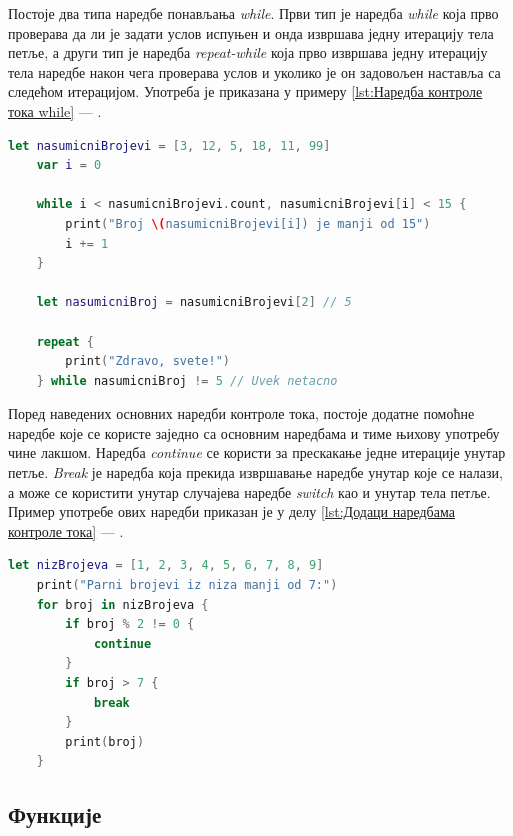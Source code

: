 \documentclass[12pt,oneside]{memoir}
\begin{document}
\indent Постоје два типа наредбе понављања \textit{while}. Први тип је наредба \textit{while} која прво проверава да ли је задати услов испуњен и онда извршава једну итерацију тела петље, а други тип је наредба \textit{repeat-while} која прво извршава једну итерацију тела наредбе након чега проверава услов и уколико је он задовољен наставља са следећом итерацијом. Употреба је приказана у примеру \ref{lst:Наредба контроле тока while} --- . 

\begin{lstlisting}[caption=\textit{{Наредба контроле тока while}}, label={lst:Наредба контроле тока while}, language=Swift, frame=single]
    let nasumicniBrojevi = [3, 12, 5, 18, 11, 99]
    var i = 0
    
    while i < nasumicniBrojevi.count, nasumicniBrojevi[i] < 15 {
        print("Broj \(nasumicniBrojevi[i]) je manji od 15")
        i += 1
    }
    
    let nasumicniBroj = nasumicniBrojevi[2] // 5
    
    repeat {
        print("Zdravo, svete!")
    } while nasumicniBroj != 5 // Uvek netacno
\end{lstlisting}

\indent Поред наведених основних наредби контроле тока, постоје додатне помоћне наредбе које се користе заједно са основним наредбама и тиме њихову употребу чине лакшом. Наредба \textit{continue} се користи за прескакање једне итерације унутар петље. \textit{Break} је наредба која прекида извршавање наредбе унутар које се налази, а може се користити унутар случајева наредбе \textit{switch} као и унутар тела петље. Пример употребе ових наредби приказан је у делу \ref{lst:Додаци наредбама контроле тока} --- .

\begin{lstlisting}[caption=\textit{{Додаци наредбaма контроле тока}}, label={lst:Додаци наредбама контроле тока}, language=Swift, frame=single]
    let nizBrojeva = [1, 2, 3, 4, 5, 6, 7, 8, 9]
    print("Parni brojevi iz niza manji od 7:")
    for broj in nizBrojeva {
        if broj % 2 != 0 {
            continue
        }
        if broj > 7 {
            break
        }
        print(broj)
    }
\end{lstlisting}

\subsection{Функције}
\end{document}
